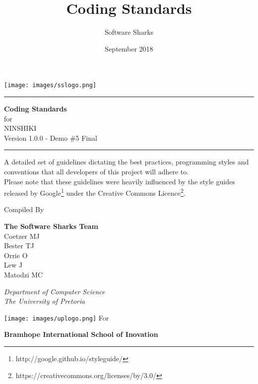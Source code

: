 \documentclass[a4paper, 11pt]{article}
\title{Coding Standards}
\author{Software Sharks}
\date{September 2018}
\newcommand{\systemTitle}{NINSHIKI}
\begin{document}
\begin{titlepage}
\texttt{[image: images/sslogo.png]}
	\centering
	
    \scshape
    \sffamily
	
	\vspace*{\baselineskip}
	
	\rule{\textwidth}{3pt}
	
	\vspace{0.75\baselineskip}
	
	\textrm{\LARGE \textbf{Coding Standards} \\ for\\ \systemTitle{}\\ \small Version 1.0.0 - Demo \#5 Final\\}
	
	\vspace{0.75\baselineskip}
	
	\rule{\textwidth}{3pt} 
	
	\vspace{2\baselineskip}
	
	A detailed set of guidelines dictating the best practices, programming styles and conventions that all developers of this project will adhere to. \\ 
    \footnotesize Please note that these guidelines were heavily influenced by the style guides released by Google\footnote{http://google.github.io/styleguide/} under the Creative Commons Licence\footnote{https://creativecommons.org/licenses/by/3.0/}.
	
	\vspace*{3\baselineskip}
	
	Compiled By
	
	\vspace{0.5\baselineskip}
	
    \textsf{\large
    \textrm{\textbf{The Software Sharks Team}} \\
    \small 
    Coetzer MJ \\
    Bester TJ \\
    Orrie O \\
    Lew J \\
    Matodzi MC \\
    } 
	
	\vspace{0.5\baselineskip}
	
	\textit{ Department of Computer Science \\ The University of Pretoria}
	
    \vfill
    \texttt{[image: images/uplogo.png]}
    \vfill
    For
	
	\vspace{0.5\baselineskip}
	
    \textsf{\large
    \textrm{\textbf{Bramhope International School of Inovation}} \\
    } 

\end{titlepage}
\end{document}
